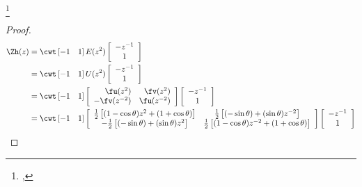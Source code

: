 \begin{example}
\label{ex:pollen4}
\footnote{
  ,
  }
\end{example}
\begin{proof}
\begin{align*}
  \Zh(z) 
    &= \cwt 
       \left[-1 \quad 1 \right]
       E(z^2)
       \left[\begin{array}{c}-z^{-1}\\ 1 \end{array}\right]
  \\&= \cwt 
       \left[-1 \quad 1 \right]
       U(z^2)
       \left[\begin{array}{c}-z^{-1}\\ 1 \end{array}\right]
  \\&= \cwt 
       \left[-1 \quad 1 \right]
       \left[\begin{array}{rr}
         \fu(z^2)      & \fv(z^2) \\
        -\fv(z^{-2})   & \fu(z^{-2})
       \end{array}\right]
       \left[\begin{array}{c}-z^{-1}\\ 1 \end{array}\right]
  \\&= \cwt 
       \left[-1 \quad 1 \right]
       \left[\begin{array}{cc}
           \frac{1}{2}\left[(1-\cos\theta)z^2 + (1+\cos\theta) \right]
       &   \frac{1}{2}\left[(-\sin\theta) + (\sin\theta)z^{-2} \right]
       \\ -\frac{1}{2}\left[(-\sin\theta) + (\sin\theta)z^{2} \right]
       &   \frac{1}{2}\left[(1-\cos\theta)z^{-2} + (1+\cos\theta) \right]
       \end{array}\right]
       \left[\begin{array}{c}-z^{-1}\\ 1 \end{array}\right]

\end{align*}
\end{proof}
